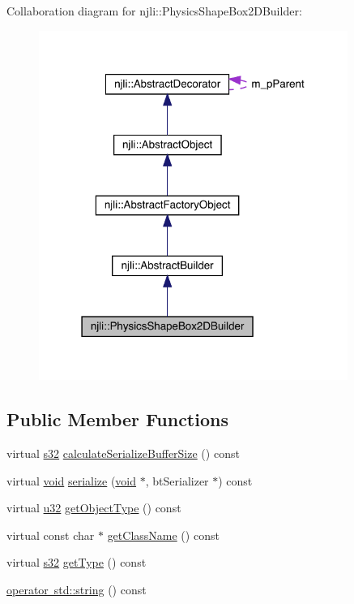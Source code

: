 Collaboration diagram for njli\+:\+:Physics\+Shape\+Box2\+D\+Builder\+:\nopagebreak
\begin{figure}[H]
\begin{center}
\leavevmode
\includegraphics[width=286pt]{classnjli_1_1_physics_shape_box2_d_builder__coll__graph}
\end{center}
\end{figure}
\subsection*{Public Member Functions}
\begin{DoxyCompactItemize}
\item 
virtual \mbox{\hyperlink{_util_8h_aa62c75d314a0d1f37f79c4b73b2292e2}{s32}} \mbox{\hyperlink{classnjli_1_1_physics_shape_box2_d_builder_abcd84070f238c9b6a9b3e5637dc98c03}{calculate\+Serialize\+Buffer\+Size}} () const
\item 
virtual \mbox{\hyperlink{_thread_8h_af1e856da2e658414cb2456cb6f7ebc66}{void}} \mbox{\hyperlink{classnjli_1_1_physics_shape_box2_d_builder_a5d79090ff3c7f67dfc64869cd8daa6b2}{serialize}} (\mbox{\hyperlink{_thread_8h_af1e856da2e658414cb2456cb6f7ebc66}{void}} $\ast$, bt\+Serializer $\ast$) const
\item 
virtual \mbox{\hyperlink{_util_8h_a10e94b422ef0c20dcdec20d31a1f5049}{u32}} \mbox{\hyperlink{classnjli_1_1_physics_shape_box2_d_builder_a37233c16c737855c53c266dc61c38460}{get\+Object\+Type}} () const
\item 
virtual const char $\ast$ \mbox{\hyperlink{classnjli_1_1_physics_shape_box2_d_builder_ae6471440a74be5d0aaf13df66ee076f2}{get\+Class\+Name}} () const
\item 
virtual \mbox{\hyperlink{_util_8h_aa62c75d314a0d1f37f79c4b73b2292e2}{s32}} \mbox{\hyperlink{classnjli_1_1_physics_shape_box2_d_builder_a9a211fdd20d1a6f5f2dda97a1d8b6b0c}{get\+Type}} () const
\item 
\mbox{\hyperlink{classnjli_1_1_physics_shape_box2_d_builder_a1ca0c35a90b675ef077c5e4a3e0203d7}{operator std\+::string}} () const
\end{DoxyCompactItemize}
